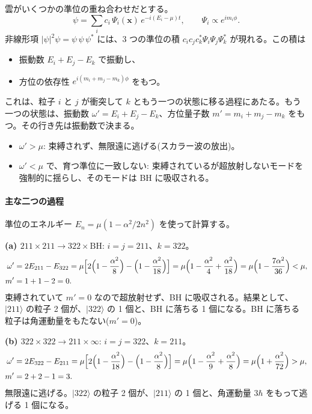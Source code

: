 雲がいくつかの準位の重ね合わせだとする。
\begin{equation}
\psi=\sum_i c_i\,\Psi_i(\bm x)\,e^{-i(E_i-\mu)t},\qquad \Psi_i\propto e^{im_i\phi}.
\end{equation}
非線形項 $|\psi|^2\psi=\psi\,\psi\,\psi^*$ には、3 つの準位の積 $c_ic_jc_k^*\Psi_i\Psi_j\Psi_k^*$ が現れる。この積は
\begin{itemize}
\item 振動数 $E_i+E_j-E_k$ で振動し、
\item 方位の依存性 $e^{i(m_i+m_j-m_k)\phi}$ をもつ。
\end{itemize}
これは、粒子 $i$ と $j$ が衝突して $k$ ともう一つの状態に移る過程にあたる。もう一つの状態は、振動数 $\omega'=E_i+E_j-E_k$、方位量子数 $m'=m_i+m_j-m_k$ をもつ。その行き先は振動数で決まる。
\begin{itemize}
\item $\omega'>\mu$: 束縛されず、無限遠に逃げる(スカラー波の放出)。
\item $\omega'<\mu$ で、育つ準位に一致しない: 束縛されているが超放射しないモードを強制的に揺らし、そのモードは BH に吸収される。
\end{itemize}

\paragraph{主な二つの過程}
準位のエネルギー $E_n=\mu(1-\alpha^2/2n^2)$ を使って計算する。

\textbf{(a) $211\times211\to322\times\mathrm{BH}$}: $i=j=211$、$k=322$。
\begin{align}
\omega'&=2E_{211}-E_{322}=\mu\Bigl[2\Bigl(1-\frac{\alpha^2}{8}\Bigr)-\Bigl(1-\frac{\alpha^2}{18}\Bigr)\Bigr]
=\mu\Bigl(1-\frac{\alpha^2}{4}+\frac{\alpha^2}{18}\Bigr)=\mu\Bigl(1-\frac{7\alpha^2}{36}\Bigr)<\mu,\\
m'&=1+1-2=0.
\end{align}
束縛されていて $m'=0$ なので超放射せず、BH に吸収される。結果として、$|211\rangle$ の粒子 2 個が、$|322\rangle$ の 1 個と、BH に落ちる 1 個になる。BH に落ちる粒子は角運動量をもたない($m'=0$)。

\textbf{(b) $322\times322\to211\times\infty$}: $i=j=322$、$k=211$。
\begin{align}
\omega'&=2E_{322}-E_{211}=\mu\Bigl[2\Bigl(1-\frac{\alpha^2}{18}\Bigr)-\Bigl(1-\frac{\alpha^2}{8}\Bigr)\Bigr]
=\mu\Bigl(1-\frac{\alpha^2}{9}+\frac{\alpha^2}{8}\Bigr)=\mu\Bigl(1+\frac{\alpha^2}{72}\Bigr)>\mu,\\
m'&=2+2-1=3.
\end{align}
無限遠に逃げる。$|322\rangle$ の粒子 2 個が、$|211\rangle$ の 1 個と、角運動量 $3\hbar$ をもって逃げる 1 個になる。

